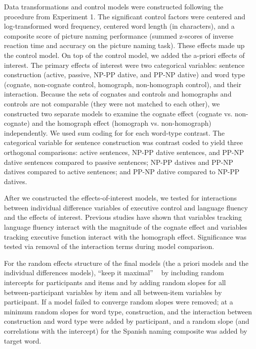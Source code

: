 Data transformations and control models were constructed following the procedure from Experiment 1. The significant control factors were centered and log-transformed word frequency, centered word length (in characters), and a composite score of picture naming performance (summed z-scores of inverse reaction time and accuracy on the picture naming task). These effects made up the control model. On top of the control model, we added the a-priori effects of interest. The primary effects of interest were two categorical variables: sentence construction (active, passive, NP-PP dative, and PP-NP dative) and word type (cognate, non-cognate control, homograph, non-homograph control), and their interaction. Because the sets of cognates and controls and homographs and controls are not comparable (they were not matched to each other), we constructed two separate models to examine the cognate effect (cognate vs. non-cognate) and the homograph effect (homograph vs. non-homograph) independently. We used sum coding for for each word-type contrast. The categorical variable for sentence construction was contrast coded to yield three orthogonal comparisons: active sentences, NP-PP dative sentences, and PP-NP dative sentences compared to passive sentences; NP-PP datives and PP-NP datives compared to active sentences; and PP-NP dative compared to NP-PP datives. 

After we constructed the effects-of-interest models, we tested for interactions between individual difference variables of executive control and language fluency and the effects of interest. Previous studies have shown that variables tracking language fluency interact with the magnitude of the cognate effect and variables tracking executive function interact with the homograph effect. Significance was tested via removal of the interaction terms during model comparison. 

For the random effects structure of the final models (the a priori models and the individual differences models), ``keep it maximal'' ~\citep{Barr2013} by including random intercepts for participants and items and by adding random slopes for all between-participant variables by item and all between-item variables by participant. If a model failed to converge random slopes were removed; at a minimum random slopes for word type, construction, and the interaction between construction and word type were added by participant, and a random slope (and correlations with the intercept) for the Spanish naming composite was added by target word. 


